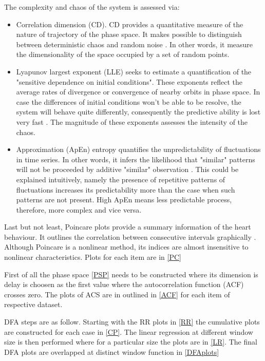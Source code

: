 The complexity and chaos of the system is assessed via:
\begin{itemize}
    \item Correlation dimension (CD). CD provides a quantitative measure of the nature of trajectory of the phase space. It makes possible to distinguish between deterministic chaos and random noise \cite{26}. In other words, it measure the dimensionality of the space occupied by a set of random points.
    \item Lyapunov largest exponent (LLE) seeks to estimate a quantification of the "sensitive dependence on initial conditions". These exponents reflect the average rates of divergence or convergence of nearby orbits in phase space. In case the differences of initial conditions won't be able to be resolve, the system will behave quite differently, consequently the predictive ability is lost very fast \cite{25}. The magnitude of these exponents assesses the intensity of the chaos.
    \item Approximation (ApEn) entropy quantifies the unpredictability of fluctuations in time series. In other words, it infers the likelihood that "similar" patterns will not be proceeded by additive "similar" observation \cite{21}. This could be explained intuitively, namely the presence of repetitive patterns of fluctuations increases its predictability more than the case when such patterns are not present. High ApEn means less predictable process, therefore, more complex and vice versa.
\end{itemize}


Last but not least, Poincare plots provide a summary information of the heart behaviour. It outlines the correlation between consecutive intervals graphically . 
Although Poincare is a nonlinear method, its indices are almost insensitive to nonlinear
characteristics. Plots for each item are in \ref{PC}

First of all the phase space \ref{PSP} needs to be constructed where its dimension is delay is choosen as the first value where the autocorrelation function (ACF) crosses zero. The plots of ACS are in outlined in \ref{ACF} for each item of respective dataset. 


DFA steps are as follow. Starting with the RR plots in \ref{RR} the cumulative plots are constructed for each case in \ref{CP}. The linear regression at different window size is then performed where for a particular size the plots are in \ref{LR}. The final DFA plots are overlapped at distinct window function in \ref{DFAplots}

